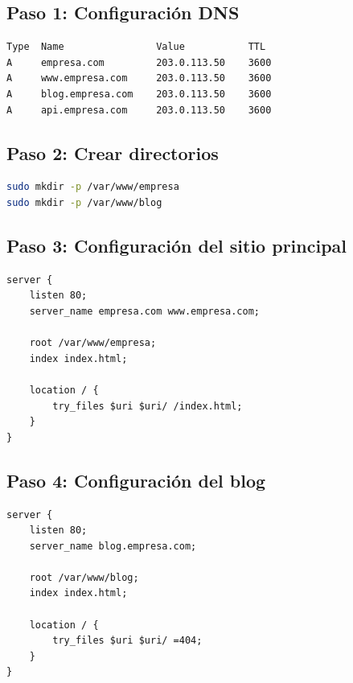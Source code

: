\documentclass[11pt,a4paper]{article}
\begin{document}
\subsection{Paso 1: Configuración DNS}

\begin{tcolorbox}[colback=yellow!5!white,colframe=yellow!75!black,title=Registros DNS]
\begin{verbatim}
Type  Name                Value           TTL
A     empresa.com         203.0.113.50    3600
A     www.empresa.com     203.0.113.50    3600
A     blog.empresa.com    203.0.113.50    3600
A     api.empresa.com     203.0.113.50    3600
\end{verbatim}
\end{tcolorbox}

\subsection{Paso 2: Crear directorios}

\begin{lstlisting}[language=bash]
sudo mkdir -p /var/www/empresa
sudo mkdir -p /var/www/blog
\end{lstlisting}

\subsection{Paso 3: Configuración del sitio principal}

\begin{lstlisting}[caption=/etc/nginx/sites-available/empresa.conf]
server {
    listen 80;
    server_name empresa.com www.empresa.com;
    
    root /var/www/empresa;
    index index.html;
    
    location / {
        try_files $uri $uri/ /index.html;
    }
}
\end{lstlisting}

\subsection{Paso 4: Configuración del blog}

\begin{lstlisting}[caption=/etc/nginx/sites-available/blog.conf]
server {
    listen 80;
    server_name blog.empresa.com;
    
    root /var/www/blog;
    index index.html;
    
    location / {
        try_files $uri $uri/ =404;
    }
}
\end{lstlisting}
\end{document}
